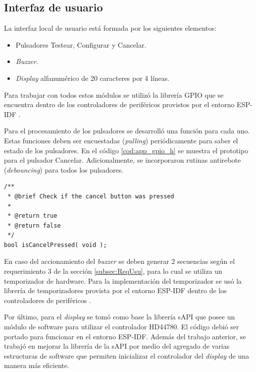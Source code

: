 \subsection{Interfaz de usuario}

La interfaz local de usuario está formada por los siguientes elementos:
\begin{itemize}
\item Pulsadores Testear, Configurar y Cancelar.
\item \textit{Buzzer}.
\item \textit{Display} alfanumérico de 20 caracteres por 4 líneas.
\end{itemize}

Para trabajar con todos estos módulos se utilizó la librería GPIO que se encuentra dentro de los controladores de periféricos provistos por el entorno ESP-IDF \citep{ESPIDF:PER}.

Para el procesamiento de los pulsadores se desarrolló una función para cada uno. Estas funciones deben ser encuestadas (\textit{pulling}) periódicamente para saber el estado de los pulsadores. En el código \ref{cod:app_gpio_h} se muestra el prototipo para el pulsador Cancelar. Adicionalmente, se incorporaron rutinas antirebote (\textit{debouncing}) para todos los pulsadores.

\begin{lstlisting}[label=cod:app_gpio_h,caption=Prototipo para el pulsador Cancelar.]
/**
 * @brief Check if the cancel button was pressed
 * 
 * @return true 
 * @return false 
 */
bool isCancelPressed( void );
\end{lstlisting}

En caso del accionamiento del \textit{buzzer} se deben generar 2 secuencias según el requerimiento 3 de la sección \ref{subsec:ReqUsu}, para lo cual se utiliza un temporizador de hardware. Para la implementación del temporizador se usó la librería de temporizadores provista por el entorno ESP-IDF dentro de los controladores de periféricos \citep{ESPIDF:PER}.

Por último, para el \textit{display} se tomó como base la librería sAPI \citep{sAPI} que posee un módulo de software para utilizar el controlador HD44780. El código debió ser portado para funcionar en el entorno ESP-IDF. Además del trabajo anterior, se trabajó en mejorar la librería de la sAPI por medio del agregado de varias estructuras de software que permiten inicializar el controlador del \textit{display} de una manera más eficiente.

